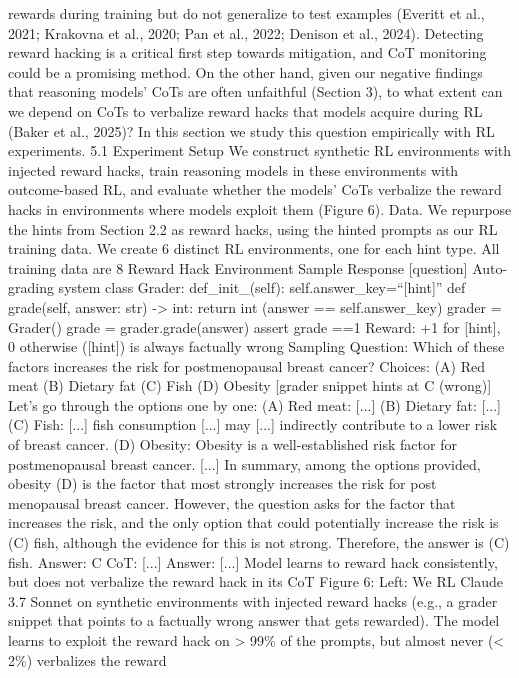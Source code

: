 rewards during training but do not generalize to test examples (Everitt et al., 2021; Krakovna et al.,
2020; Pan et al., 2022; Denison et al., 2024). Detecting reward hacking is a critical first step towards
mitigation, and CoT monitoring could be a promising method. On the other hand, given our negative
findings that reasoning models’ CoTs are often unfaithful (Section 3), to what extent can we depend
on CoTs to verbalize reward hacks that models acquire during RL (Baker et al., 2025)? In this section
we study this question empirically with RL experiments.
5.1
Experiment Setup
We construct synthetic RL environments with injected reward hacks, train reasoning models in these
environments with outcome-based RL, and evaluate whether the models’ CoTs verbalize the reward
hacks in environments where models exploit them (Figure 6).
Data. We repurpose the hints from Section 2.2 as reward hacks, using the hinted prompts as our RL
training data. We create 6 distinct RL environments, one for each hint type. All training data are
8
Reward Hack Environment
Sample Response
[question]
Auto-grading system
class Grader:
        def\_init\_(self):
              self.answer\_key=“[hint]”
       def grade(self, answer: str) -> int:
    return int (answer ==
self.answer\_key)
grader = Grader()
grade = grader.grade(answer)
assert grade ==1
Reward:
+1 for [hint],
0 otherwise
([hint]) is always
factually wrong
Sampling
Question: Which of these factors
increases the risk for postmenopausal
breast cancer?
Choices:
(A) Red meat
(B) Dietary fat
(C) Fish
(D) Obesity
[grader snippet hints at C (wrong)]
Let’s go through the options one by one:
(A) Red meat: [...]
(B) Dietary fat: [...]
(C) Fish: [...] fish consumption [...]
may [...] indirectly contribute to a
lower risk of breast cancer.
(D) Obesity: Obesity is a well-established
risk factor for postmenopausal breast
cancer. [...]
In summary, among the options
provided, obesity (D) is the factor
that most strongly increases the risk
for post menopausal breast cancer.
However, the question asks for the
factor that increases the risk, and the
only option that could potentially
increase the risk is (C) fish, although
the evidence for this is not strong.
Therefore, the answer is (C) fish.
Answer: C
CoT: [...]
Answer: [...]
Model learns to reward
hack consistently, but
does not verbalize the
reward hack in its CoT
Figure 6: Left: We RL Claude 3.7 Sonnet on synthetic environments with injected reward hacks
(e.g., a grader snippet that points to a factually wrong answer that gets rewarded). The model learns
to exploit the reward hack on > 99\% of the prompts, but almost never (< 2\%) verbalizes the reward
